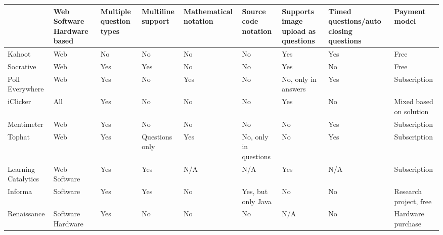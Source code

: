 \begin{landscape}
\thispagestyle{empty}
    \begin{center}
        \begin{table}[H]
            \begin{tabularx}{\paperwidth}{ |X|X|X|X|X|X|X|X|X| } 
             \hline
                 & Web \newline Software \newline Hardware based & Multiple question types & Multiline support & Mathematical notation & Source code notation & Supports image upload as questions & Timed questions/auto closing questions & Payment model \\ \hline
                 
              Kahoot                & Web   & No    & No    & \cellcolor{red!25}No    & \cellcolor{red!25}No    & Yes   & Yes   & Free \\ \hline
              Socrative             & Web   & Yes   & Yes   & \cellcolor{red!25}No    & \cellcolor{red!25}No    & Yes   & No    & Free \\ \hline
              Poll Everywhere       & Web   & Yes   & No    & \cellcolor{green!25}Yes   & \cellcolor{red!25}No    & No, only in answers   & Yes   & Subscription \\ \hline
              iClicker              & All   & Yes   & No    & \cellcolor{red!25}No    & \cellcolor{red!25}No    & Yes   & No    & Mixed based on solution \\ \hline
              Mentimeter            & Web   & Yes & No   & \cellcolor{red!25}No    & \cellcolor{red!25}No    & No    & Yes   & Subscription \\ \hline
              Tophat                & Web   & Yes & Questions only & \cellcolor{green!25}Yes & \cellcolor{red!25}No, only in questions   & No    & Yes & Subscription \\ \hline
              Learning Catalytics   & Web \newline Software   & Yes    & Yes  & N/A   & N/A   & Yes   & N/A   & Subscription \\ \hline
              Informa        & Software & Yes & Yes  & \cellcolor{red!25}No & \cellcolor{green!25}Yes, but only Java   & No    & No    & Research project, free \\ \hline
              Renaissance           & Software \newline Hardware & Yes & No & \cellcolor{red!25} No & \cellcolor{red!25}No & N/A & No & Hardware purchase \\ \hline

\end{tabularx}
\end{table}
\end{center}
\end{landscape}
